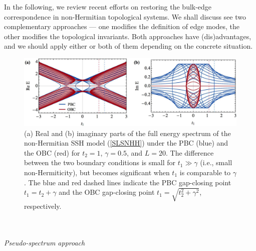 \documentclass{tADP2e}
\theoremstyle{plain}
\theoremstyle{plain}
\theoremstyle{definition}
\begin{document}
In the following, we review recent efforts on restoring the bulk-edge correspondence in non-Hermitian topological systems. We shall discuss see two complementary approaches --- one modifies the definition of edge modes, the other modifies the topological invariants. Both approaches have (dis)advantages,  and we should apply either or both of them depending on the concrete situation.
\begin{figure}[!t]
\begin{center}
\includegraphics[width=12cm]{./Figures/fig_5_POBC.pdf}
\end{center}
\caption{(a) Real and (b) imaginary parts of the full energy spectrum of the non-Hermitian SSH model (\ref{SLSNHH}) under the PBC (blue) and the OBC (red) for $t_2=1$, $\gamma=0.5$, and $L=20$. The difference between the two boundary conditions  is small for $t_1\gg\gamma$ (i.e., small non-Hermiticity), but becomes significant when $t_1$ is comparable to $\gamma$.  The blue and red dashed lines indicate the PBC gap-closing point $t_1=t_2+\gamma$ and the OBC gap-closing point $t_1=\sqrt{t_2^2+\gamma^2}$, respectively.}
\label{fig:POBC}
\end{figure}
\\ \\ {\it Pseudo-spectrum approach}
\end{document}
